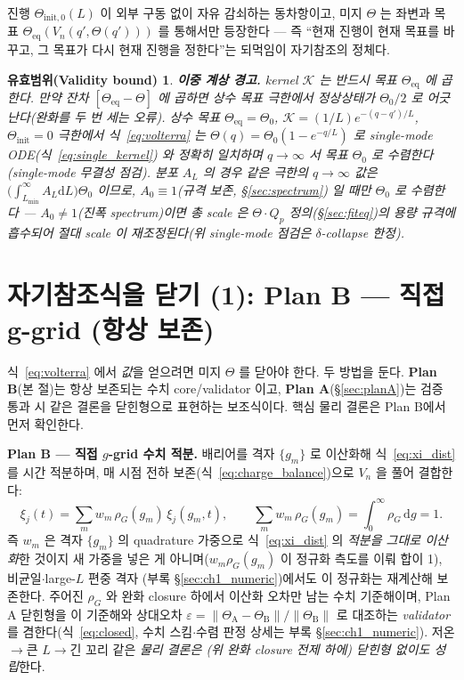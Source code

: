 \documentclass[11pt,a4paper]{article}
\newtheorem*{boundbox}{유효범위(Validity bound)}
\newcommand{\dd}{\mathrm{d}}
\newcommand{\eq}{\mathrm{eq}}
\begin{document}
진행 $\Theta_{\mathrm{init},0}(L)$ 이 외부 구동 없이 자유 감쇠하는 동차항이고, 미지 $\Theta$ 는 좌변과 목표
$\Theta_\eq(V_n(q',\Theta(q')))$ 를 통해서만 등장한다 — 즉 ``현재 진행이 현재 목표를 바꾸고, 그 목표가 다시
현재 진행을 정한다''는 되먹임이 자기참조의 정체다.
\begin{boundbox}
\textbf{이중 계상 경고.} kernel $\mathcal K$ 는 반드시 \emph{목표} $\Theta_\eq$ 에 곱한다. 만약 잔차
$[\Theta_\eq-\Theta]$ 에 곱하면 상수 목표 극한에서 정상상태가 $\Theta_0/2$ 로 어긋난다(완화를 두 번 세는
오류). 상수 목표 $\Theta_\eq=\Theta_0$, $\mathcal K=(1/L)e^{-(q-q')/L}$, $\Theta_\mathrm{init}=0$ 극한에서
식~\eqref{eq:volterra} 는 $\Theta(q)=\Theta_0(1-e^{-q/L})$ 로 single-mode ODE(식~\eqref{eq:single_kernel})
와 정확히 일치하며 $q\to\infty$ 서 목표 $\Theta_0$ 로 수렴한다(single-mode 무결성 점검). \emph{분포} $A_L$ 의 경우
같은 극한의 $q\to\infty$ 값은 $\big(\int_{L_{\min}}^\infty A_L\dd L\big)\Theta_0$ 이므로, $A_0\equiv1$(규격 보존, \S\ref{sec:spectrum})
일 때만 $\Theta_0$ 로 수렴한다 — $A_0\ne1$(진폭 spectrum)이면 총 scale 은 $\Theta\cdot Q_p$ 정의(\S\ref{sec:fiteq})의
용량 규격에 흡수되어 절대 scale 이 재조정된다(위 single-mode 점검은 $\delta$-collapse 한정).
\end{boundbox}
\section{자기참조식을 닫기 (1): Plan B — 직접 g-grid (항상 보존)}\label{sec:planB}
식~\eqref{eq:volterra} 에서 \emph{값}을 얻으려면 미지 $\Theta$ 를 닫아야 한다. 두 방법을 둔다.
\textbf{Plan B}(본 절)는 항상 보존되는 수치 core/validator 이고, \textbf{Plan A}(\S\ref{sec:planA})는
검증 통과 시 같은 결론을 닫힌형으로 표현하는 보조식이다. 핵심 물리 결론은 Plan B에서 먼저 확인한다.

\textbf{Plan B — 직접 $g$-grid 수치 적분.} 배리어를 격자 $\{g_m\}$ 로 이산화해
식~\eqref{eq:xi_dist} 를 시간 적분하며, 매 시점 전하 보존(식~\eqref{eq:charge_balance})으로 $V_n$ 을 풀어 결합한다:
\begin{equation*}
\xi_j(t)=\sum_m w_m\,\rho_G(g_m)\,\xi_j(g_m,t),\qquad \sum_m w_m\,\rho_G(g_m)=\int_0^\infty\rho_G\,\dd g=1.
\end{equation*}
즉 $w_m$ 은 격자 $\{g_m\}$ 의 quadrature 가중으로 식~\eqref{eq:xi_dist} 의 \emph{적분을 그대로 이산화}한 것이지
새 가중을 넣은 게 아니며($w_m\rho_G(g_m)$ 이 정규화 측도를 이뤄 합이 1), 비균일$\cdot$large-$L$ 편중 격자
(부록 \S\ref{sec:ch1_numeric})에서도 이 정규화는 재계산해 보존한다. 주어진 $\rho_G$ 와 완화 closure 하에서
이산화 오차만 남는 수치 기준해이며, Plan A 닫힌형을 이 기준해와 상대오차
$\varepsilon=\lVert\Theta_\mathrm A-\Theta_\mathrm B\rVert/\lVert\Theta_\mathrm B\rVert$ 로 대조하는 \emph{validator}
를 겸한다(식~\eqref{eq:closed}, 수치 스킴$\cdot$수렴 판정 상세는 부록 \S\ref{sec:ch1_numeric}). 저온$\to$큰
$L\to$긴 꼬리 같은 \emph{물리 결론은 (위 완화 closure 전제 하에) 닫힌형 없이도 성립}한다.
\end{document}
